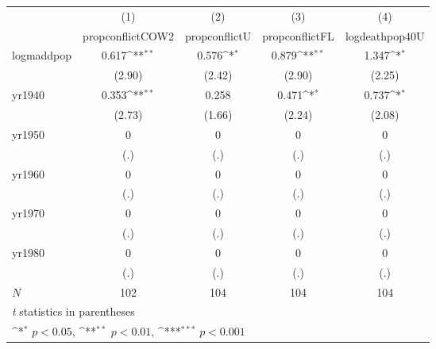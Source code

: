 {
\def\sym#1{\ifmmode^{#1}\else\(^{#1}\)\fi}
\begin{tabular}{l*{4}{c}}
\hline\hline
            &\multicolumn{1}{c}{(1)}&\multicolumn{1}{c}{(2)}&\multicolumn{1}{c}{(3)}&\multicolumn{1}{c}{(4)}\\
            &\multicolumn{1}{c}{propconflictCOW2}&\multicolumn{1}{c}{propconflictU}&\multicolumn{1}{c}{propconflictFL}&\multicolumn{1}{c}{logdeathpop40U}\\
\hline
logmaddpop  &       0.617\sym{**} &       0.576\sym{*}  &       0.879\sym{**} &       1.347\sym{*}  \\
            &      (2.90)         &      (2.42)         &      (2.90)         &      (2.25)         \\
[1em]
yr1940      &       0.353\sym{**} &       0.258         &       0.471\sym{*}  &       0.737\sym{*}  \\
            &      (2.73)         &      (1.66)         &      (2.24)         &      (2.08)         \\
[1em]
yr1950      &           0         &           0         &           0         &           0         \\
            &         (.)         &         (.)         &         (.)         &         (.)         \\
[1em]
yr1960      &           0         &           0         &           0         &           0         \\
            &         (.)         &         (.)         &         (.)         &         (.)         \\
[1em]
yr1970      &           0         &           0         &           0         &           0         \\
            &         (.)         &         (.)         &         (.)         &         (.)         \\
[1em]
yr1980      &           0         &           0         &           0         &           0         \\
            &         (.)         &         (.)         &         (.)         &         (.)         \\
\hline
\(N\)       &         102         &         104         &         104         &         104         \\
\hline\hline
\multicolumn{5}{l}{\footnotesize \textit{t} statistics in parentheses}\\
\multicolumn{5}{l}{\footnotesize \sym{*} \(p<0.05\), \sym{**} \(p<0.01\), \sym{***} \(p<0.001\)}\\
\end{tabular}
}
